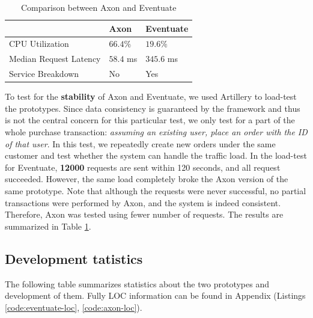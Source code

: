 \begin{table}[H]
    \begin{center}
        \begin{tabular}{ | m{2cm} | l | l | }

            \hline
            & Axon & Eventuate \\

            \hline
            CPU Utilization &
            $66.4\%$ &
            $19.6\%$ \\

            \hline
            Median Request Latency &
            $58.4$ ms &
            $345.6$ ms \\

            \hline
            Service Breakdown & No & Yes \\

            \hline

        \end{tabular}
    \end{center}
    \caption{Comparison between Axon and Eventuate}
    \label{table:load}
\end{table}

To test for the \textbf{stability} of Axon and Eventuate, we used Artillery to load-test the prototypes. Since data consistency is guaranteed by the framework and thus is not the central concern for this particular test, we only test for a part of the whole purchase transaction: \textit{assuming an existing user, place an order with the ID of that user}. In this test, we repeatedly create new orders under the same customer and test whether the system can handle the traffic load. In the load-test for Eventuate, \textbf{12000} requests are sent within 120 seconds, and all request succeeded. However, the same load completely broke the Axon version of the same prototype. Note that although the requests were never successful, no partial transactions were performed by Axon, and the system is indeed consistent. Therefore, Axon was tested using fewer number of requests. The results are summarized in Table \ref{table:load}.

\subsection{Development tatistics}

The following table summarizes statistics about the two prototypes and development of them. Fully LOC information can be found in Appendix (Listings \ref{code:eventuate-loc}, \ref{code:axon-loc}).


